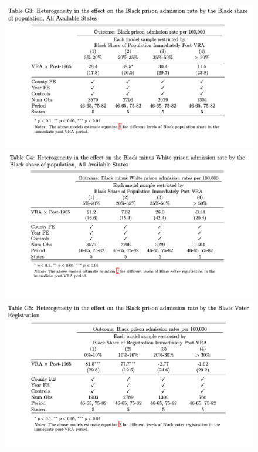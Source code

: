 \documentclass[12pt]{article}
\begin{document}
\begin{figure}[h!]
	\centering
	\includegraphics[width=5.9in, clip=true, trim=0.0in 0.8in 0in 0in]{../../60_appendix_cty_results/table_g3.png} \\
	\includegraphics[width=5.9in, clip=true, trim=0.0in 0.8in 0in 0in]{../../60_appendix_cty_results/table_g4.png} \\
	\includegraphics[width=5.9in]{../../60_appendix_cty_results/table_g5.png}
\end{figure}
\end{document}
